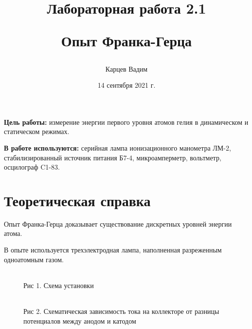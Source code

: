 \documentclass[12pt]{article}
\date{14 сентября 2021 г.}
\author{Карцев Вадим}
\title{Лабораторная работа 2.1

Опыт Франка-Герца}
\begin{document}
\maketitle

\textbf{Цель работы:} измерение энергии первого уровня атомов гелия в динамическом и статическом режимах.

\textbf{В работе используются:} серийная лампа ионизационного манометра ЛМ-2, стабилизированный источник питания
Б7-4, микроамперметр, вольтметр, осцилограф C1-83.

\section{Теоретическая справка}
  Опыт Франка-Герца доказывает существование дискретных уровней энергии атома.

  В опыте используется трехэлектродная лампа, наполненная разреженным
  одноатомным газом.

  \begin {figure}[h!]
    \begin{minipage}[h]{0.49\linewidth}
        \\
        Рис 1. Схема установки
    \end{minipage}
    \begin{minipage}[h]{0.49\linewidth}
        \\
        Рис 2. Схематическая зависимость тока на коллекторе от разницы потенциалов между анодом и катодом
    \end{minipage}
    \label {fig:image1}
  \end {figure}
\end{document}
